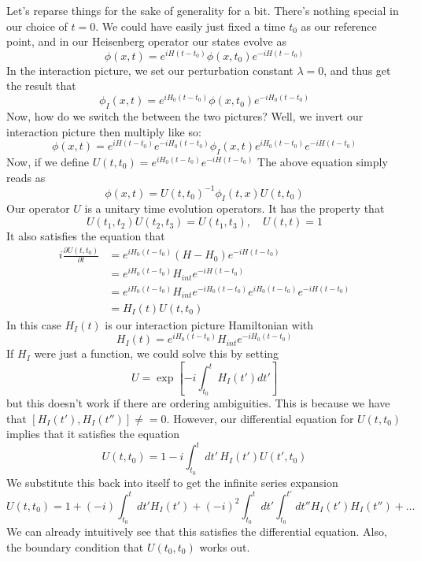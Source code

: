 \documentclass[11pt, oneside]{article}   	%
\theoremstyle{newline}
\theoremstyle{newline}
\theoremstyle{newline}
\theoremstyle{newline}
\theoremstyle{newline}
\begin{document}
Let's reparse things for the sake of generality for a bit. 
There's nothing special in our choice of $ t = 0$. 
We could have easily just fixed a time  $ t_0 $ as our reference point, 
and in our Heisenberg operator our states evolve as 
\[
\phi ( x ,t ) = e^{ i H ( t - t_0 ) } \phi ( x, t_0 ) e^{  - i H ( t - t_0 ) }
\] In the interaction picture, we set our perturbation constant $ \lambda = 0$, and thus
get the result that 
\[
\phi_I ( x, t ) = e^{ i H_0 ( t - t_0 ) } \phi( x, t_0 ) e^{ - i H_0 ( t - t_0 ) }
\] Now, how do we switch the between the two pictures? 
Well, we invert our interaction picture then multiply like so: 
\[
\phi ( x, t) = e^{ i H ( t - t_0 ) } e^{  -i H_0 ( t - t_0 ) } \phi_I ( x, t ) e^{ i H_0 ( t - t_0 ) } e^{  - i H ( t - t_0 ) }
\] Now, if we define $ U ( t, t_0 ) = e^{ i H_0 ( t - t_0 ) } e^{  - i H ( t - t_0 ) }$
The above equation simply reads as 
\[
\phi ( x, t ) = U ( t, t_0 )^{ -1 }  \phi_ I ( t , x) U ( t, t_0 ) 
\] Our operator $ U $ is a unitary time evolution operators. It has the property that 
\[
U ( t_1 , t_2) U ( t_2, t_3 ) = U ( t_1, t_3), \quad U ( t, t) = 1 
\] It also satisfies the equation that 
\begin{align*} 
i \frac{\partial  U ( t, t_0 ) }{\partial t }  &=  e^{ i H_0 ( t -t_0 ) } ( H - H_0 ) e^{  - i H ( t - t_0 ) }  \\
		       &=  e^{ i H_0 ( t - t_0 ) } H_{int} e^{  -i H ( t - t_0 ) }  \\
		       &=  e^{ i H_0 ( t - t_0 ) } H_{int} e^{  - i H_0 ( t - t_0 ) } e^{ i H_0 ( t - t_0 ) } e^{  - iH ( t - t_0 ) }\\
		       &=  H_I ( t) U ( t, t_0)  
\end{align*} In this case $ H _I ( t) $ is our interaction picture 
Hamiltonian with 
\[
H_I ( t )  = e^{ i H_0 ( t - t_0 ) } H_{ int} e^{  - i H_0 ( t - t_0 ) }
\] 
If $ H_I $ were just a function, we could solve this by setting
\[
U = \exp \left[  - i \int_{t_ 0 }^ t H_I ( t' ) dt '  \right] 
\] but this doesn't work if there are ordering ambiguities.
This is because we have that $ [ H_I ( t' ), H _I ( t'' ) ] \neq = 0 $. 
However, our differential equation for  $ U ( t, t_0 ) $ implies that it
satisfies the equation 
\[
U ( t , t_0 ) = 1 - i \int_{ t_0 }^ t dt' \, H_I ( t' ) U ( t' , t_0 ) 
\] We substitute this back into itself to  get the infinite series 
expansion 
\[
U ( t, t_0) = 1 + ( - i ) \int_{ t_0}^ t dt' H_I ( t' ) + ( -i ) ^ 2 \int_{t_0}^t dt' \int_{t_0 }^{ t' }  dt'' H_I ( t' ) H_I ( t'' ) + \dots 
\] We can already intuitively see that 
this satisfies the differential equation. 
Also, the boundary condition that $ U ( t_0 , t_0 ) $ works out. 
\end{document}
